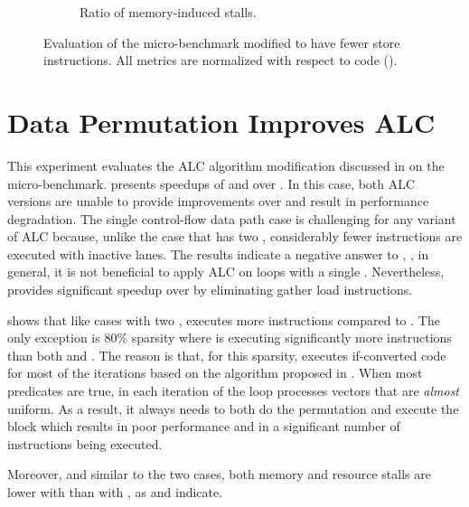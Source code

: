 \begin{figure}[h!]
\begin{subfigure}{.5\textwidth}
    \caption{Ratio of memory-induced stalls.}
    \label{fig:single-if-many-scatter-mem-stalls}
  \end{subfigure}%
  \caption{Evaluation of the \ifElseBench micro-benchmark modified to have fewer store instructions. All metrics are normalized with respect to \ifconverted code (\ifconv).}
\end{figure}

\section{Data Permutation Improves ALC}
\label{sec:eval-single-if}

This experiment evaluates the ALC algorithm modification discussed in  on the \ifThenBench micro-benchmark.
 presents speedups of \ALC and \ALCdp over \ifconv.
In this case, both ALC versions are unable to provide improvements over \ifconv and result in performance degradation.
The single control-flow data path case is challenging for any variant of ALC because, unlike the \ifElseBench case that has two \cpaths, considerably fewer instructions are executed with inactive lanes.
The results indicate a negative answer to , \ie, in general, it is not beneficial to apply ALC on loops with a single \cpath.
Nevertheless, \ALCdp provides significant speedup over \ALC by eliminating gather load instructions.

 shows that like cases with two \cpath, \ALCdp executes more instructions compared to \ALC. The only exception is $80\%$ sparsity where \ALC is executing significantly more instructions than both \ALCdp and \ifconv. The reason is that, for this sparsity, \ALCdp executes if-converted code for most of the iterations based on the algorithm proposed in . When most predicates are true, in each iteration of the loop \ALC processes vectors that are \emph{almost} uniform. As a result, it always needs to both do the permutation and execute the \Then block which results in poor performance and in a significant number of instructions being executed.   

Moreover, and similar to the two \cpath cases, both memory and resource stalls are lower with \ALCdp than with \ALC, as  and  indicate.

